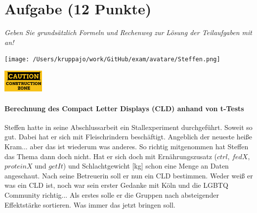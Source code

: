 \documentclass[a4paper, 9pt]{scrartcl}\usepackage[]{graphicx}\usepackage[]{xcolor}
\begin{document}
 
\clearpage

\section{Aufgabe \hfill (12 Punkte)}

\textit{Geben Sie grundsätzlich Formeln und Rechenweg zur Lösung der Teilaufgaben mit an!} \\[1Ex]
 

 
\begin{minipage}[t]{0.5\textwidth}
\texttt{[image: /Users/kruppajo/work/GitHub/exam/avatare/Steffen.png]}
\end{minipage}
\begin{minipage}[t]{0.5\textwidth}
\hfill
\href{https://youtu.be/RagTFFKFbFg}{\includegraphics[width = 2cm]{img/caution}}
\end{minipage}
\vspace{-3ex}



\paragraph{Berechnung des Compact Letter Displays (CLD) anhand von t-Tests}

Steffen hatte in seine Abschlussarbeit ein Stallexperiment durchgeführt. Soweit so gut. Dabei hat er sich mit Fleischrindern beschäftigt. Angeblich der neueste heiße Kram... aber das ist wiederum was anderes. So richtig mitgenommen hat Steffen das Thema dann doch nicht. Hat er sich doch mit Ernährungszusatz ($ctrl$, $fedX$, $proteinX$ und $getIt$) und Schlachtgewicht [kg] schon eine Menge an Daten angeschaut. Nach seine Betreuerin soll er nun ein CLD bestimmen. Weder weiß er was ein CLD ist, noch war sein erster Gedanke mit Köln und die LGBTQ Community richtig... Als erstes solle er die Gruppen nach absteigender Effektstärke sortieren. Was immer das jetzt bringen soll.
\end{document}

